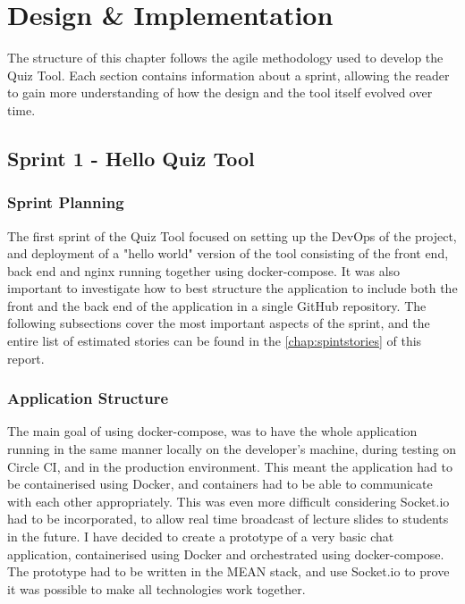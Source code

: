 \chapter{Design \& Implementation}

The structure of this chapter follows the agile methodology used to develop the
Quiz Tool. Each section contains information about a sprint, allowing the reader
to gain more understanding of how the design and the tool itself evolved over time.

\section{Sprint 1 - Hello Quiz Tool}
\subsection{Sprint Planning}
The first sprint of the Quiz Tool focused on setting up the DevOps of the project,
and deployment of a "hello world" version of the tool consisting of the front end,
back end and nginx\cite{34} running together using docker-compose. It was also important
to investigate how to best structure the application to include both the front and the
back end of the application in a single GitHub repository. The following subsections
cover the most important aspects of the sprint, and the entire list of estimated
stories can be found in the \autoref{chap:spintstories} of this report.

\subsection{Application Structure}
The main goal of using docker-compose, was to have the whole application running in
the same manner locally on the developer's machine, during testing on Circle CI, and
in the production environment. This meant the application had to be containerised
using Docker, and containers had to be able to communicate with each other appropriately.
This was even more difficult considering Socket.io had to be incorporated, to allow
real time broadcast of lecture slides to students in the future. I have decided to
create a prototype of a very basic chat application, containerised using Docker and
orchestrated using docker-compose. The prototype had to be written in the MEAN stack,
and use Socket.io to prove it was possible to make all technologies work together.

